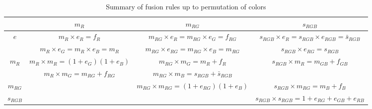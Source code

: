 \documentclass[nofootinbib,pra,twocolumn,showpacs,superscriptaddress,notitlepage,amsmath]{revtex4-2} %
\begin{document}
\begin{table}[h!]
    \centering
    \begin{tabular}{|c|c|c|c|}
    \hline
       &  $m_{R}$ & $m_{RG}$ & $s_{RGB}$  \\
       \hline
    $e$       & $m_R \times e_R = f_R$ & $m_{RG} \times e_R = m_{RG} \times e_G = f_{RG}$ &$s_{RGB} \times e_R =  s_{RGB} \times e_{RGB} = \bar s_{RGB}$\\
     & $m_R \times e_G = m_R \times e_B =m_R$ &$m_{RG} \times e_{RG} = m_{RG} \times e_B =m_{RG}$& $s_{RGB} \times e_{RG} =s_{RGB}$\\
    \hline
    $m_{R}$  &$m_R \times m_R = (1+e_G)(1+e_B)$& $m_{RG} \times m_{G}= m_R + f_R$& $s_{RGB} \times m_R = m_{GB} + f_{GB}$\\
     & $m_{R} \times m_{G} = m_{RG} + f_{RG}$ &$m_{RG} \times m_B = s_{RGB}+ \bar s_{RGB}$ & \\
    \hline
    $m_{RG}$&&$m_{RG} \times m_{RG} = (1+e_{RG})(1+e_B)$&$ s_{RGB} \times m_{RG} = m_{B} + f_{B}$\\
    \hline
    $s_{RGB}$ & &&$s_{RGB} \times s_{RGB} = 1 + e_{RG}+ e_{GB} + e_{RB}$\\
    \hline
    \end{tabular}
    \caption{Summary of fusion rules up to permutation of colors}
    \label{tab:D4fusion}
\end{table}
\end{document}
